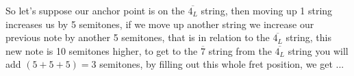 \documentclass[preview]{standalone}
\begin{document}
\begin{center}
So let's suppose our anchor point is on the $\overline{4_L}$ string, then moving up 1 string increases us by 5 semitones, if we move up another string we increase our previous note by another 5 semitones, that is in relation to the $\overline{4_L}$ string, this new note is 10 semitones higher, to get to the $\overline{7}$ string from the $\overline{4_L}$ string you will add $(5 + 5 + 5) = 3$ semitones, by filling out this whole fret position, we get ...
\end{center}
\end{document}
